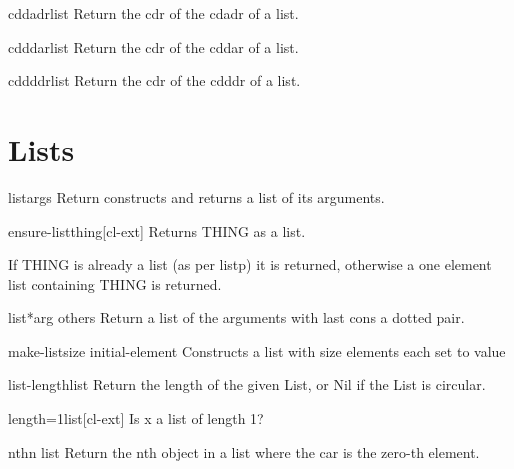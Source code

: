 \documentclass[10pt,english]{book}
\begin{document}
\begin{accessor}{cddadr}{list}
  Return the cdr of the cdadr of a list.
\end{accessor}

\begin{accessor}{cdddar}{list}
  Return the cdr of the cddar of a list.
\end{accessor}

\begin{accessor}{cddddr}{list}
  Return the cdr of the cdddr of a list.
\end{accessor}

\section{Lists}
\label{sec:lists}

\begin{function}{list}{\rest args}
  Return constructs and returns a list of its arguments.
\end{function}

\begin{function}{ensure-list}{thing}[cl-ext]
  Returns THING as a list.

If THING is already a list (as per listp) it is returned,
otherwise a one element list containing THING is returned.
\end{function}

\begin{function}{list*}{arg \rest others}
  Return a list of the arguments with last cons a dotted pair.
\end{function}

\begin{function}{make-list}{size \key initial-element}
  Constructs a list with size elements each set to value
\end{function}

\begin{function}{list-length}{list}
  Return the length of the given List, or Nil if the List is circular.
\end{function}

\begin{function}{length=1}{list}[cl-ext]
  Is x a list of length 1?
\end{function}

\begin{accessor}{nth}{n list}
  Return the nth object in a list where the car is the zero-th element.
\end{accessor}
\end{document}
